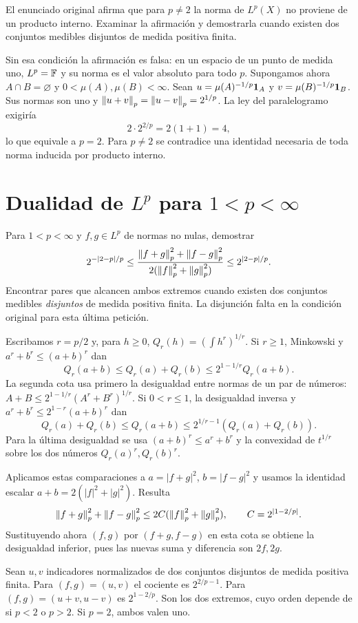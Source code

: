 \begin{ejercicio}\label{ej:v2-l19-2}
El enunciado original afirma que para $p\ne2$ la norma de $L^p(X)$ no proviene de un producto interno. Examinar la afirmación y demostrarla cuando existen dos conjuntos medibles disjuntos de medida positiva finita.
\end{ejercicio}
\begin{solucion}
Sin esa condición la afirmación es falsa: en un espacio de un punto de medida uno, $L^p=\mathbb F$ y su norma es el valor absoluto para todo $p$. Supongamos ahora $A\cap B=\varnothing$ y $0<\mu(A),\mu(B)<\infty$. Sean $u=\mu(A)^{-1/p}\mathbf1_{A}$ y $v=\mu(B)^{-1/p}\mathbf1_{B}$. Sus normas son uno y $\left\lVert u+v\right\rVert_p=\left\lVert u-v\right\rVert_p=2^{1/p}$. La ley del paralelogramo exigiría
\[
 2\cdot2^{2/p}=2(1+1)=4,
\]
lo que equivale a $p=2$. Para $p\ne2$ se contradice una identidad necesaria de toda norma inducida por producto interno.
\end{solucion}

\chapter{Dualidad de \texorpdfstring{$L^p$ para $1<p<\infty$}{Lp para 1<p<infinito}}

\begin{ejercicio}\label{ej:v2-l21-1}
Para $1<p<\infty$ y $f,g\in L^p$ de normas no nulas, demostrar
\[
 2^{-|2-p|/p}\le
 \frac{\left\lVert f+g\right\rVert_p^2+\left\lVert f-g\right\rVert_p^2}{2(\left\lVert f\right\rVert_p^2+\left\lVert g\right\rVert_p^2)}
 \le2^{|2-p|/p}.
\]
Encontrar pares que alcancen ambos extremos cuando existen dos conjuntos medibles \emph{disjuntos} de medida positiva finita. La disjunción falta en la condición original para esta última petición.
\end{ejercicio}
\begin{solucion}
Escribamos $r=p/2$ y, para $h\ge0$, $Q_r(h)=(\int h^r)^{1/r}$. Si $r\ge1$, Minkowski y $a^r+b^r\le(a+b)^r$ dan
\[
 Q_r(a+b)\le Q_r(a)+Q_r(b)\le2^{1-1/r}Q_r(a+b).
\]
La segunda cota usa primero la desigualdad entre normas de un par de números: $A+B\le2^{1-1/r}(A^r+B^r)^{1/r}$. Si $0<r\le1$, la desigualdad inversa y $a^r+b^r\le2^{1-r}(a+b)^r$ dan
\[
 Q_r(a)+Q_r(b)\le Q_r(a+b)\le2^{1/r-1}(Q_r(a)+Q_r(b)).
\]
Para la última desigualdad se usa $(a+b)^r\le a^r+b^r$ y la convexidad de $t^{1/r}$ sobre los dos números $Q_r(a)^r,Q_r(b)^r$.

Aplicamos estas comparaciones a $a=|f+g|^2$, $b=|f-g|^2$ y usamos la identidad escalar $a+b=2(|f|^2+|g|^2)$. Resulta
\[
 \left\lVert f+g\right\rVert_p^2+\left\lVert f-g\right\rVert_p^2
 \le2C(\left\lVert f\right\rVert_p^2+\left\lVert g\right\rVert_p^2),\qquad C=2^{|1-2/p|}.
\]
Sustituyendo ahora $(f,g)$ por $(f+g,f-g)$ en esta cota se obtiene la desigualdad inferior, pues las nuevas suma y diferencia son $2f,2g$.

Sean $u,v$ indicadores normalizados de dos conjuntos disjuntos de medida positiva finita. Para $(f,g)=(u,v)$ el cociente es $2^{2/p-1}$. Para $(f,g)=(u+v,u-v)$ es $2^{1-2/p}$. Son los dos extremos, cuyo orden depende de si $p<2$ o $p>2$. Si $p=2$, ambos valen uno.
\end{solucion}

